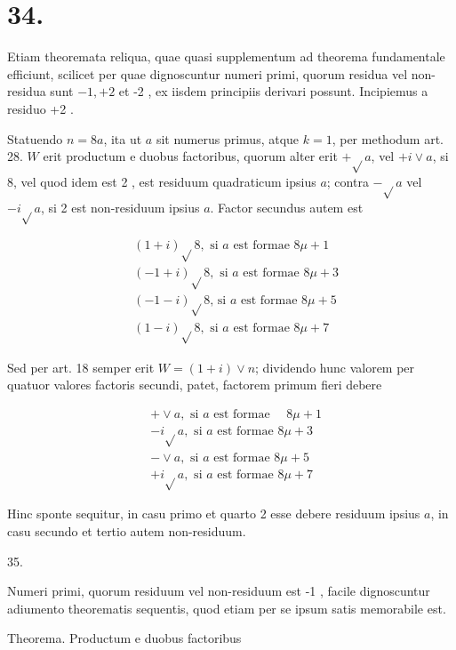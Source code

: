 \documentclass[10pt]{article}
\begin{document}
\section*{34.}
Etiam theoremata reliqua, quae quasi supplementum ad theorema fundamentale efficiunt, scilicet per quae dignoscuntur numeri primi, quorum residua vel non-residua sunt \(-1,+2\) et -2 , ex iisdem principiis derivari possunt. Incipiemus a residuo +2 .

Statuendo \(n=8 a\), ita ut \(a\) sit numerus primus, atque \(k=1\), per methodum art. 28. \(W\) erit productum e duobus factoribus, quorum alter erit \(+\sqrt{ } a\), vel \(+i \vee a\), si 8, vel quod idem est 2 , est residuum quadraticum ipsius \(a\); contra \(-\sqrt{ } a\) vel \(-i \sqrt{ } a\), si 2 est non-residuum ipsius \(a\). Factor secundus autem est

\[
\begin{aligned}
& (1+i) \sqrt{ } 8, \text { si } a \text { est formae } 8 \mu+1 \\
& (-1+i) \sqrt{ } 8, \text { si } a \text { est formae } 8 \mu+3 \\
& (-1-i) \sqrt{ } 8 \text {, si } a \text { est formae } 8 \mu+5 \\
& (1-i) \sqrt{ } 8, \text { si } a \text { est formae } 8 \mu+7
\end{aligned}
\]

Sed per art. 18 semper erit \(W=(1+i) \vee n\); dividendo hunc valorem per quatuor valores factoris secundi, patet, factorem primum fieri debere

\[
\begin{aligned}
& +\vee a, \text { si } a \text { est formae } \quad 8 \mu+1 \\
& -i \sqrt{ } a, \text { si } a \text { est formae } 8 \mu+3 \\
& -\vee a, \text { si } a \text { est formae } 8 \mu+5 \\
& +i \sqrt{ } a, \text { si } a \text { est formae } 8 \mu+7
\end{aligned}
\]

Hinc sponte sequitur, in casu primo et quarto 2 esse debere residuum ipsius \(a\), in casu secundo et tertio autem non-residuum.

35.

Numeri primi, quorum residuum vel non-residuum est -1 , facile dignoscuntur adiumento theorematis sequentis, quod etiam per se ipsum satis memorabile est.

Theorema. Productum e duobus factoribus
\end{document}
